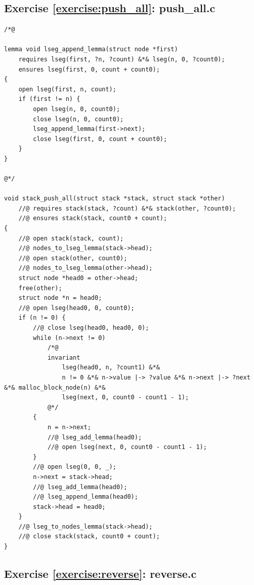 \documentclass{article}
\begin{document}
\subsection{Exercise
\ref{exercise:push_all}: push\_all.c}\label{solution:push_all}

\begin{lstlisting}
/*@

lemma void lseg_append_lemma(struct node *first)
    requires lseg(first, ?n, ?count) &*& lseg(n, 0, ?count0);
    ensures lseg(first, 0, count + count0);
{
    open lseg(first, n, count);
    if (first != n) {
        open lseg(n, 0, count0);
        close lseg(n, 0, count0);
        lseg_append_lemma(first->next);
        close lseg(first, 0, count + count0);
    }
}

@*/

void stack_push_all(struct stack *stack, struct stack *other)
    //@ requires stack(stack, ?count) &*& stack(other, ?count0);
    //@ ensures stack(stack, count0 + count);
{
    //@ open stack(stack, count);
    //@ nodes_to_lseg_lemma(stack->head);
    //@ open stack(other, count0);
    //@ nodes_to_lseg_lemma(other->head);
    struct node *head0 = other->head;
    free(other);
    struct node *n = head0;
    //@ open lseg(head0, 0, count0);
    if (n != 0) {
        //@ close lseg(head0, head0, 0);
        while (n->next != 0)
            /*@
            invariant
                lseg(head0, n, ?count1) &*&
                n != 0 &*& n->value |-> ?value &*& n->next |-> ?next &*& malloc_block_node(n) &*&
                lseg(next, 0, count0 - count1 - 1);
            @*/
        {
            n = n->next;
            //@ lseg_add_lemma(head0);
            //@ open lseg(next, 0, count0 - count1 - 1);
        }
        //@ open lseg(0, 0, _);
        n->next = stack->head;
        //@ lseg_add_lemma(head0);
        //@ lseg_append_lemma(head0);
        stack->head = head0;
    }
    //@ lseg_to_nodes_lemma(stack->head);
    //@ close stack(stack, count0 + count);
}
\end{lstlisting}

\subsection{Exercise
\ref{exercise:reverse}: reverse.c}\label{solution:reverse}
\end{document}
